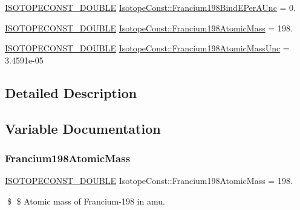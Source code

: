 \begin{DoxyCompactItemize}
\mbox{\hyperlink{group___isotope_const-_macros_ga8f45a7272ce02c0b4c65c44636ed719a}{I\+S\+O\+T\+O\+P\+E\+C\+O\+N\+S\+T\+\_\+\+D\+O\+U\+B\+LE}} \mbox{\hyperlink{group___isotope_const-_francium-_fr198_gaa4bb3d191832914108333e324711ff48}{Isotope\+Const\+::\+Francium198\+Bind\+E\+Per\+A\+Unc}} = 0.
\item 
\mbox{\hyperlink{group___isotope_const-_macros_ga8f45a7272ce02c0b4c65c44636ed719a}{I\+S\+O\+T\+O\+P\+E\+C\+O\+N\+S\+T\+\_\+\+D\+O\+U\+B\+LE}} \mbox{\hyperlink{group___isotope_const-_francium-_fr198_ga1d955d265b4ac1ddf58dfd7a32c6573c}{Isotope\+Const\+::\+Francium198\+Atomic\+Mass}} = 198.
\item 
\mbox{\hyperlink{group___isotope_const-_macros_ga8f45a7272ce02c0b4c65c44636ed719a}{I\+S\+O\+T\+O\+P\+E\+C\+O\+N\+S\+T\+\_\+\+D\+O\+U\+B\+LE}} \mbox{\hyperlink{group___isotope_const-_francium-_fr198_gaa4c5602b5a7877b22cee6c10c7ce6441}{Isotope\+Const\+::\+Francium198\+Atomic\+Mass\+Unc}} = 3.\+4591e-\/05
\end{DoxyCompactItemize}


\subsection{Detailed Description}


\subsection{Variable Documentation}
\mbox{\label{group___isotope_const-_francium-_fr198_ga1d955d265b4ac1ddf58dfd7a32c6573c}} 
\subsubsection{\texorpdfstring{Francium198\+Atomic\+Mass}{Francium198AtomicMass}}
{\footnotesize\ttfamily \mbox{\hyperlink{group___isotope_const-_macros_ga8f45a7272ce02c0b4c65c44636ed719a}{I\+S\+O\+T\+O\+P\+E\+C\+O\+N\+S\+T\+\_\+\+D\+O\+U\+B\+LE}} Isotope\+Const\+::\+Francium198\+Atomic\+Mass = 198.}

\$ \$ Atomic mass of Francium-\/198 in amu. \mbox{\label{group___isotope_const-_francium-_fr198_gaa4c5602b5a7877b22cee6c10c7ce6441}} 

